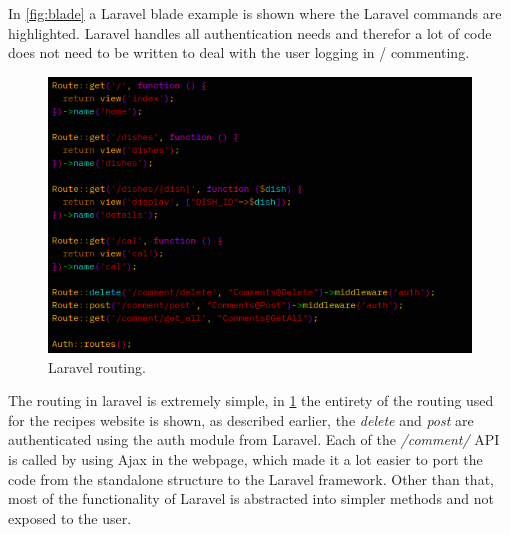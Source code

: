 \documentclass[a4paper]{scrartcl}
\begin{document}
\noindent
In \ref{fig:blade} a Laravel blade example is shown where the Laravel commands
are highlighted. Laravel handles all authentication needs and therefor
a lot of code does not need to be written to deal with the user logging in / commenting.

\begin{figure}[H]
  \begin{center}
    \includegraphics[scale=1.0]{images/routes.png}
    \caption{Laravel routing.}
    \label{fig:routes}
  \end{center}
\end{figure}

\noindent
The routing in laravel is extremely simple, in \ref{fig:routes} the entirety of the
routing used for the recipes website is shown, as described earlier, the \textit{delete} and
\textit{post} are authenticated using the auth module from Laravel.
Each of the \textit{/comment/} API is called by using Ajax in the webpage,
which made it a lot easier to port the code from the standalone structure to 
the Laravel framework. Other than that, most of the functionality of Laravel is
abstracted into simpler methods and not exposed to the user.
\end{document}
